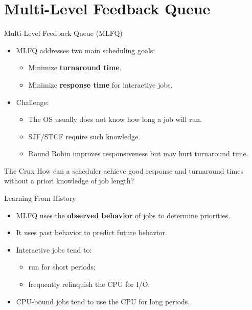 \section{Multi-Level Feedback Queue}

\begin{frame}{Multi-Level Feedback Queue (MLFQ)}
    \begin{itemize}
        \item MLFQ addresses two main scheduling goals:
        \begin{itemize}
            \item Minimize \textbf{turnaround time}.
            \item Minimize \textbf{response time} for interactive jobs.
        \end{itemize}

        \item Challenge:
        \begin{itemize}
            \item The OS usually does not know how long a job will run.
            \item SJF/STCF require such knowledge.
            \item Round Robin improves responsiveness but may hurt turnaround time.
        \end{itemize}
    \end{itemize}

    \begin{block}{The Crux}
        How can a scheduler achieve good response and turnaround times
        without a priori knowledge of job length?
    \end{block}
\end{frame}


\begin{frame}{Learning From History}
    \begin{itemize}
        \item MLFQ uses the \textbf{observed behavior} of jobs to determine priorities.
        \item It uses past behavior to predict future behavior.
        \item Interactive jobs tend to:
        \begin{itemize}
            \item run for short periods;
            \item frequently relinquish the CPU for I/O.
        \end{itemize}
        \item CPU-bound jobs tend to use the CPU for long periods.
    \end{itemize}
\end{frame}

